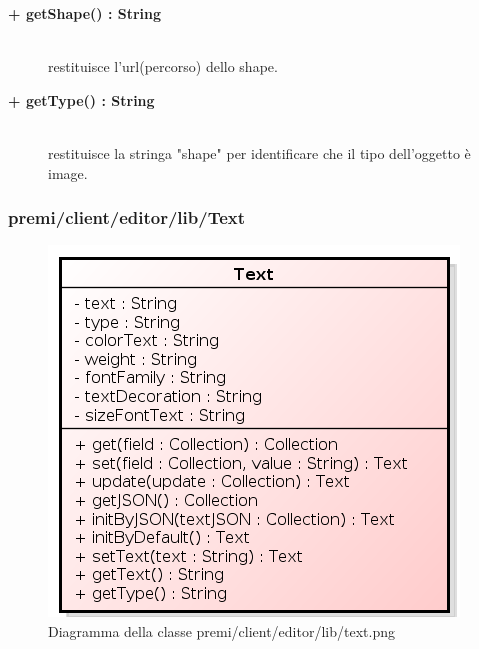 \begin{description}
\begin{description}
\end{description}

\begin{description}
		\item[\textbf{\color{blue}+ getShape() : String			}] \hfill \\
			restituisce l'url(percorso) dello shape. 

\end{description}

\begin{description}
		\item[\textbf{\color{blue}+ getType() : String			}] \hfill \\
			restituisce la stringa "shape" per identificare che il tipo dell'oggetto è image. 

\end{description}



\end{description}


\subsubsection{premi/client/editor/lib/Text}
\begin{figure}[h]
\begin{center}
\includegraphics[scale=0.40]{img/diacla/text.png}
\caption{Diagramma della classe premi/client/editor/lib/text.png}
\end{center}
\end{figure}

